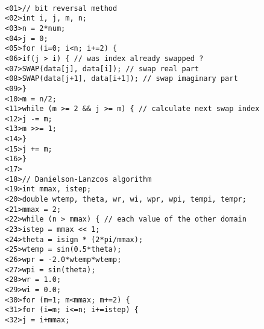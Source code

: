 \addvspace{12pt}

\texttt{ \\
<01>\quad // bit reversal method \\
<02>\quad int i, j, m, n; \\
<03>\quad n = 2*num; \\
<04>\quad j = 0; \\
<05>\quad for (i=0; i<n; i+=2) \{ \\
<06>\quad \qquad if(j > i) \{   // was index already swapped ? \\
<07>\quad \qquad\qquad SWAP(data[j], data[i]);   // swap real part \\
<08>\quad \qquad\qquad SWAP(data[j+1], data[i+1]);   // swap imaginary part \\
<09>\quad \qquad \} \\
<10>\quad \qquad m = n/2; \\
<11>\quad \qquad while (m >= 2 \&\& j >= m) \{  // calculate next swap index \\
<12>\quad \qquad\qquad j -= m; \\
<13>\quad \qquad\qquad m >>= 1; \\
<14>\quad \qquad \} \\
<15>\quad \qquad j += m; \\
<16>\quad \} \\
<17>\quad \\
<18>\quad // Danielson-Lanzcos algorithm \\
<19>\quad int mmax, istep; \\
<20>\quad double wtemp, theta, wr, wi, wpr, wpi, tempi, tempr; \\
<21>\quad mmax = 2; \\
<22>\quad while (n > mmax) \{ // each value of the other domain \\
<23>\quad \qquad istep = mmax << 1; \\
<24>\quad \qquad theta = isign * (2*pi/mmax); \\
<25>\quad \qquad wtemp = sin(0.5*theta); \\
<26>\quad \qquad wpr = -2.0*wtemp*wtemp; \\
<27>\quad \qquad wpi = sin(theta); \\
<28>\quad \qquad wr = 1.0; \\
<29>\quad \qquad wi = 0.0; \\
<30>\quad \qquad for (m=1; m<mmax; m+=2) \{ \\
<31>\quad \qquad\qquad for (i=m; i<=n; i+=istep) \{ \\
<32>\quad \qquad\qquad\qquad j = i+mmax; \\
}
